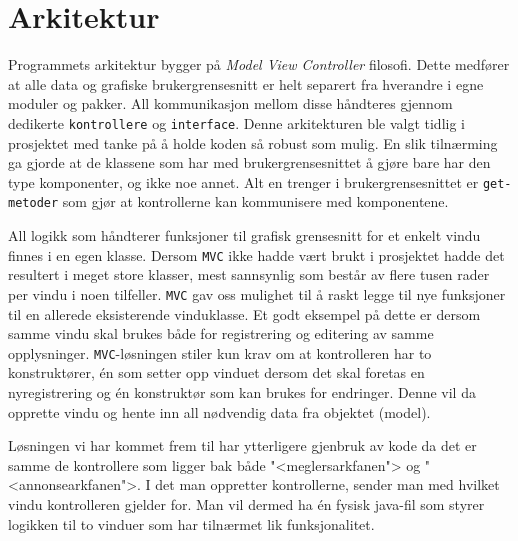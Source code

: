 \section{Arkitektur}
Programmets arkitektur bygger på \textit{Model View Controller} filosofi. Dette medfører at alle data og grafiske brukergrensesnitt er helt separert fra hverandre i egne moduler og pakker. All kommunikasjon mellom disse håndteres gjennom dedikerte \texttt{kontrollere} og \texttt{interface}. Denne arkitekturen ble valgt tidlig i prosjektet med tanke på å holde koden så robust som mulig. En slik tilnærming ga gjorde at de klassene som har med brukergrensesnittet å gjøre bare har den type komponenter, og ikke noe annet. Alt en trenger i brukergrensesnittet er \texttt{get-metoder} som gjør at kontrollerne kan kommunisere med komponentene.

All logikk som håndterer funksjoner til grafisk grensesnitt for et enkelt vindu finnes i en egen klasse. Dersom \texttt{MVC} ikke hadde vært brukt i prosjektet hadde det resultert i meget store klasser, mest sannsynlig som består av flere tusen rader per vindu i noen tilfeller. \texttt{MVC} gav oss mulighet til å raskt legge til nye funksjoner til en allerede eksisterende vinduklasse. Et godt eksempel på dette er dersom samme vindu skal brukes både for registrering og editering av samme opplysninger. \texttt{MVC}-løsningen stiler kun krav om at kontrolleren har to konstruktører, én som setter opp vinduet dersom det skal foretas en nyregistrering og én konstruktør som kan brukes for endringer. Denne vil da opprette vindu og hente inn all nødvendig data fra objektet (model). 

Løsningen vi har kommet frem til har ytterligere gjenbruk av kode da det er samme de kontrollere som ligger bak både "<meglersarkfanen"> og "<annonsearkfanen">. I det man oppretter kontrollerne, sender man med hvilket vindu kontrolleren gjelder for. Man vil dermed ha én fysisk java-fil som styrer logikken til to vinduer som har tilnærmet lik funksjonalitet.